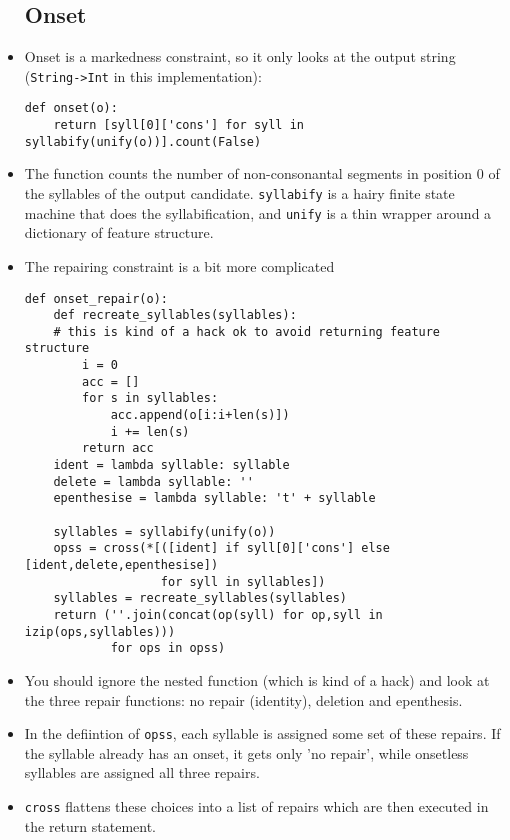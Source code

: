 \documentclass{article}[11pt]
\begin{document}
\begin{itemize}
\subsection{Onset}
\item Onset is a markedness constraint, so it only looks at the output string
  (\verb+String->Int+ in this implementation):
\begin{verbatim}
def onset(o):
    return [syll[0]['cons'] for syll in syllabify(unify(o))].count(False)
\end{verbatim}
\item The function counts the number of non-consonantal segments in position 0
  of the syllables of the output candidate. \verb+syllabify+ is a
  hairy finite state machine that does the syllabification, and
  \verb+unify+ is a thin wrapper around a dictionary of feature
  structure.
\item The repairing constraint is a bit more complicated
\begin{verbatim}
def onset_repair(o):
    def recreate_syllables(syllables):
    # this is kind of a hack ok to avoid returning feature structure
        i = 0
        acc = []
        for s in syllables:
            acc.append(o[i:i+len(s)])
            i += len(s)
        return acc
    ident = lambda syllable: syllable
    delete = lambda syllable: ''
    epenthesise = lambda syllable: 't' + syllable

    syllables = syllabify(unify(o))
    opss = cross(*[([ident] if syll[0]['cons'] else [ident,delete,epenthesise])
                   for syll in syllables])
    syllables = recreate_syllables(syllables)
    return (''.join(concat(op(syll) for op,syll in izip(ops,syllables)))
            for ops in opss)
\end{verbatim}
\item You should ignore the nested function (which is kind of a hack) and
  look at the three repair functions: no repair (identity), deletion and epenthesis.
\item In the defiintion of \verb+opss+, each syllable is assigned some set of these
  repairs. If the syllable already has an onset, it gets only 'no repair', while
  onsetless syllables are assigned all three repairs.
\item \verb+cross+ flattens these choices into a list of repairs which are then
  executed in the return statement.

\end{itemize}
\end{document}
